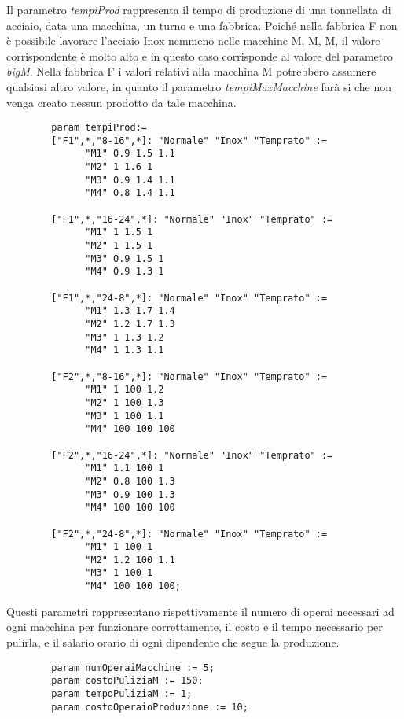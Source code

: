 \documentclass[12pt]{article} %
\begin{document}
		Il parametro \textit{tempiProd} rappresenta il tempo di produzione di una tonnellata di acciaio, data una macchina, un turno e una fabbrica.
		Poich\'e nella fabbrica F non è possibile lavorare l'acciaio Inox nemmeno nelle macchine M, M, M, il valore corrispondente è molto alto e in questo caso corrisponde al valore del parametro \textit{bigM}.
		Nella fabbrica F i valori relativi alla macchina M potrebbero assumere qualsiasi altro valore, in quanto il parametro \textit{tempiMaxMacchine} farà si che non venga creato nessun prodotto da tale macchina.
		\begin{lstlisting}
		param tempiProd:=
		["F1",*,"8-16",*]: "Normale" "Inox" "Temprato" :=
		      "M1" 0.9 1.5 1.1
		      "M2" 1 1.6 1
		      "M3" 0.9 1.4 1.1
		      "M4" 0.8 1.4 1.1
		      
		["F1",*,"16-24",*]: "Normale" "Inox" "Temprato" :=
		      "M1" 1 1.5 1
		      "M2" 1 1.5 1
		      "M3" 0.9 1.5 1
		      "M4" 0.9 1.3 1

		["F1",*,"24-8",*]: "Normale" "Inox" "Temprato" :=
		      "M1" 1.3 1.7 1.4
		      "M2" 1.2 1.7 1.3
		      "M3" 1 1.3 1.2
		      "M4" 1 1.3 1.1

		["F2",*,"8-16",*]: "Normale" "Inox" "Temprato" :=
		      "M1" 1 100 1.2
		      "M2" 1 100 1.3
		      "M3" 1 100 1.1 
		      "M4" 100 100 100
		      
		["F2",*,"16-24",*]: "Normale" "Inox" "Temprato" :=
		      "M1" 1.1 100 1
		      "M2" 0.8 100 1.3
		      "M3" 0.9 100 1.3 
		      "M4" 100 100 100

		["F2",*,"24-8",*]: "Normale" "Inox" "Temprato" :=
		      "M1" 1 100 1
		      "M2" 1.2 100 1.1
		      "M3" 1 100 1 
		      "M4" 100 100 100;
		\end{lstlisting}

		Questi parametri rappresentano rispettivamente il numero di operai necessari ad ogni macchina per funzionare correttamente, il costo e il tempo necessario per pulirla, e  il salario orario di ogni dipendente che segue la produzione.
		\begin{lstlisting}
		param numOperaiMacchine := 5;
		param costoPuliziaM := 150;
		param tempoPuliziaM := 1;
		param costoOperaioProduzione := 10;
		\end{lstlisting}
\end{document}
